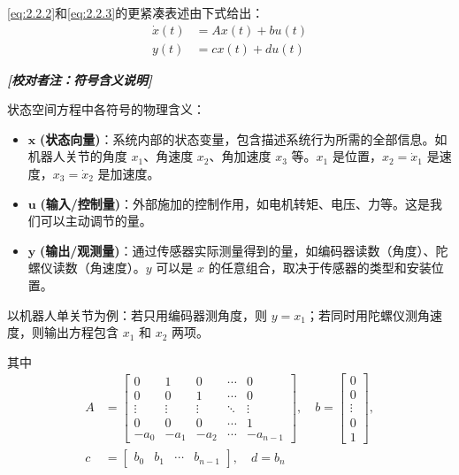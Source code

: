 \documentclass[UTF8,12pt,a4paper]{ctexart}
\theoremstyle{definition}
\begin{document}
\eqref{eq:2.2.2}和\eqref{eq:2.2.3}的更紧凑表述由下式给出：
\begin{equation}\label{eq:2.2.4}
\begin{aligned}
\dot{x}(t) &= Ax(t) + bu(t) \\
y(t) &= cx(t) + du(t)
\end{aligned}
\end{equation}

{\small\itshape
\hspace*{2em}\textbf{[校对者注：符号含义说明]}

\hspace*{2em}状态空间方程中各符号的物理含义：
\begin{itemize}
    \item $\boldsymbol{x}$ \textbf{(状态向量)}：系统内部的状态变量，包含描述系统行为所需的全部信息。如机器人关节的角度 $x_1$、角速度 $x_2$、角加速度 $x_3$ 等。$x_1$ 是位置，$x_2=\dot{x}_1$ 是速度，$x_3=\dot{x}_2$ 是加速度。
    
    \item $\boldsymbol{u}$ \textbf{(输入/控制量)}：外部施加的控制作用，如电机转矩、电压、力等。这是我们可以主动调节的量。
    
    \item $\boldsymbol{y}$ \textbf{(输出/观测量)}：通过传感器实际测量得到的量，如编码器读数（角度）、陀螺仪读数（角速度）。$y$ 可以是 $x$ 的任意组合，取决于传感器的类型和安装位置。
\end{itemize}

\hspace*{2em}以机器人单关节为例：若只用编码器测角度，则 $y=x_1$；若同时用陀螺仪测角速度，则输出方程包含 $x_1$ 和 $x_2$ 两项。
}

其中
\begin{equation}\label{eq:2.2.5}
\begin{aligned}
A &= \begin{bmatrix}
0 & 1 & 0 & \cdots & 0 \\
0 & 0 & 1 & \cdots & 0 \\
\vdots & \vdots & \vdots & \ddots & \vdots \\
0 & 0 & 0 & \cdots & 1 \\
-a_0 & -a_1 & -a_2 & \cdots & -a_{n-1}
\end{bmatrix}, \quad
b = \begin{bmatrix} 0 \\ 0 \\ \vdots \\ 0 \\ 1 \end{bmatrix}, \\
c &= \begin{bmatrix} b_0 & b_1 & \cdots & b_{n-1} \end{bmatrix}, \quad d = b_n
\end{aligned}
\end{equation}
\end{document}
